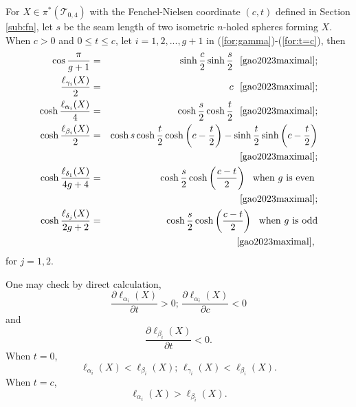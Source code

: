 \documentclass[UTF8]{amsart}
\numberwithin{equation}{section}
\theoremstyle{definition}
\theoremstyle{example}
\theoremstyle{remark}
\begin{document}
For $X \in \pi^{*}(\mathcal{T}_{0,4})$ with the Fenchel-Nielsen coordinate $(c,t)$ defined in Section \ref{sub:fn}, let $s$ be the seam length of two isometric $n$-holed spheres forming $X$. When $c>0$ and $0 \le t \le c$, let $i = 1,2,...,g+1$ in (\ref{for:gamma})-(\ref{for:t=c}), then 
\begin{eqnarray}
 \cos \frac{\pi}{g+1} &=& \sinh \frac{c}{2} \sinh \frac{s}{2}  \text{\,\,\,\,\cite[(5-1)]{gao2023maximal}}; \label{for:seam_cuff} \\
\frac{\ell_{\gamma_i}(X)}{2} &=& c \text{\,\,\,\,\cite[(5-2), $\ell_{\gamma_i}(X) = 2|l_{CE}|$]{gao2023maximal}}; \label{for:gamma}\\
 \cosh \frac{\ell_{\alpha_i}(X)}{4} &=& \cosh \frac{s}{2} \cosh \frac{t}{2} \text{\,\,\,\,\cite[(5-3), $\ell_{\alpha_i}(X) = 4|l_{CD}|$]{gao2023maximal}}; \label{for:alpha}\\
 \cosh \frac{\ell_{\beta_i}(X)}{2} &=& \cosh s \cosh \frac{t}{2} \cosh \left( c- \frac{t}{2} \right) - \sinh \frac{t}{2} \sinh \left( c- \frac{t}{2} \right) \label{for:beta} \\
     & &\text{\,\,\,\,\cite[(5-5), $\ell_{\beta_i}(X) = 2|l_{C}|$]{gao2023maximal}}; \nonumber \\
 \cosh \frac{\ell_{\delta_1}(X)}{4g+4} &=& \cosh \frac{s}{2}\cosh \left(  \frac{c - t}{2} \right) \,\,\,\,\text{when $g$ is even }\label{for:delta_even}\\
          && \text{\cite[(5-4), $\ell_{\delta_1}(X) = 4(g+1) |l_{DE}|$]{gao2023maximal}}; \nonumber \\
 \cosh \frac{\ell_{\delta_j}(X)}{2g+2} &=& \cosh \frac{s}{2}\cosh \left( \frac{c - t}{2} \right) \,\,\,\,\text{when $g$ is odd}\label{for:delta_odd}\\
          &&\text{\cite[(5-4), $\ell_{\delta_j}(X) = 2(g+1) |l_{DE}|$]{gao2023maximal}, }\nonumber
\end{eqnarray}
for $j=1,2$. 

One may check by direct calculation, 
\begin{equation}
 \frac{\partial \ell_{\alpha_i}(X)}{\partial t} >0;\, \frac{\partial \ell_{\alpha_i}(X)}{\partial c} <0 \label{for:pd_alpha}
\end{equation}
and
\begin{equation}
 \frac{\partial \ell_{\beta_i}(X)}{\partial t} <0. \label{for:pd_beta}
\end{equation}
When $t=0$, 
\begin{equation}
 \ell_{\alpha_i}(X) < \ell_{\beta_i}(X);\, \ell_{\gamma_i}(X) < \ell_{\beta_i}(X). \label{for:t=0}
\end{equation}
When $t=c$,
\begin{equation}
 \ell_{\alpha_i}(X) > \ell_{\beta_i}(X). \label{for:t=c}
\end{equation}
\end{document}
